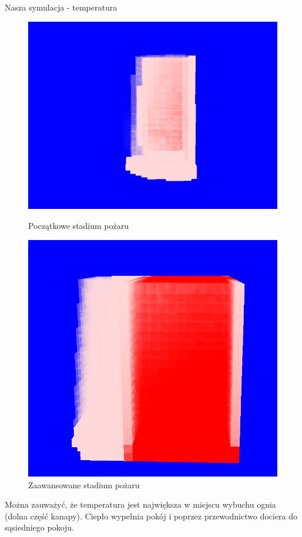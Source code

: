 \documentclass{beamer}
\begin{document}
\begin{frame}{Nasza symulacja - temperatura}
\begin{figure}[htbp]
  \centering
  \begin{minipage}{.45\textwidth}
    \includegraphics[width=\textwidth]{5.png}
    \caption{Początkowe stadium pożaru}
    \label{fig:image5}
  \end{minipage}%
  \hfill
  \begin{minipage}{.4\textwidth}
    \includegraphics[width=\textwidth]{6.png}
    \caption{Zaawansowane stadium pożaru}
    \label{fig:image6}
  \end{minipage}
\end{figure}

Można zauważyć, że temperatura jest największa w miejscu wybuchu ognia (dolna część kanapy). Ciepło wypełnia pokój i poprzez przewodnictwo dociera do sąsiedniego pokoju.
\end{frame}
\end{document}
